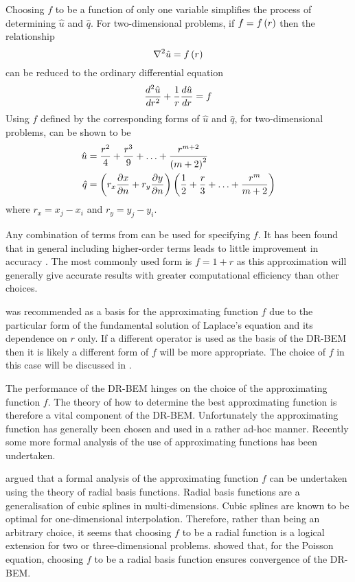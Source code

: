 Choosing $f$ to be a function of only one variable simplifies the process
of determining $\hat{u}$ and $\hat{q}$.  For two-dimensional problems, if $f
=  f\left( r \right) $ then the relationship
\begin{equation}
  \nabla^{2} {\hat{u}} =  f\left( r \right)  
\end{equation}
can be reduced to the ordinary differential equation
\begin{equation}
   \dfrac{ d^{2} \hat{u}}{d {r}^{2}}  + \dfrac{1}{r}  \dfrac{ d \hat{u}}{d r}  = f 
\end{equation}
Using $f$ defined by  the corresponding forms of $\hat{u}$
and $\hat{q}$, for two-dimensional problems, can be shown to be
\begin{align}
  \hat{u} & = \dfrac{r^{2}}{4} + \dfrac{r^{3}}{9} + \ldots +
  \dfrac{r^{m+2}}{\left( m+2 \right)^{2}} \\ \hat{q} & = \left( r_{x}  \dfrac{\partial x}{\partial n}  +
    r_{y}  \dfrac{\partial y}{\partial n}  \right) \left( \dfrac{1}{2} + \dfrac{r}{3} +\ldots+
    \dfrac{r^{m}}{m+2} \right)
\end{align}
where $r_{x} = x_{j} - x_{i}$ and $r_{y} = y_{j} - y_{i}$.

Any combination of terms from  can be used for specifying
$f$. It has been found that in general including higher-order terms leads
to little improvement in accuracy \cite{partridge:1992}. The most commonly
used form is $f = 1 + r$ as this approximation will generally give accurate
results with greater computational efficiency than other choices.

 was recommended as a basis for the approximating function
$f$ due to the particular form of the fundamental solution of Laplace's
equation and its dependence on $r$ only. If a different operator is used as
the basis of the DR-BEM then it is likely a different form of $f$ will be
more appropriate.  The choice of $f$ in this case will be discussed in
.

The performance of the DR-BEM hinges on the choice of the approximating
function $f$.  The theory of how to determine the best approximating
function is therefore a vital component of the DR-BEM.  Unfortunately the
approximating function has generally been chosen and used in a rather
ad-hoc manner.  Recently some more formal analysis of the use of
approximating functions has been undertaken. 

 argued that a formal analysis of the approximating
function $f$ can be undertaken using the theory of radial basis functions.
Radial basis functions are a generalisation of cubic splines in
multi-dimensions.  Cubic splines are known to be optimal for one-dimensional
interpolation.  Therefore, rather than being an arbitrary choice, it seems
that choosing $f$ to be a radial function is a logical extension for two
or three-dimensional problems.   showed that, for the
Poisson equation, choosing $f$ to be a radial basis function ensures
convergence of the DR-BEM.

